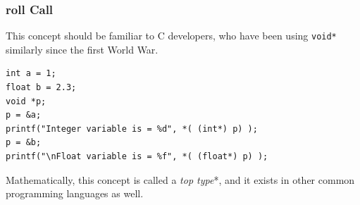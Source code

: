 \documentclass{beamer}
\begin{document}
\begin{frame}[fragile]

\frametitle{roll \textbf{C}all}

This concept should be familiar to C developers, who have been using \texttt{void*} similarly since the first World War.

\begin{lstlisting}
int a = 1;
float b = 2.3;
void *p;
p = &a;
printf("Integer variable is = %d", *( (int*) p) );
p = &b;
printf("\nFloat variable is = %f", *( (float*) p) );
\end{lstlisting}

Mathematically, this concept is called a \textit{top type}*, and it exists in other common programming languages as well.
\end{frame}
\end{document}
